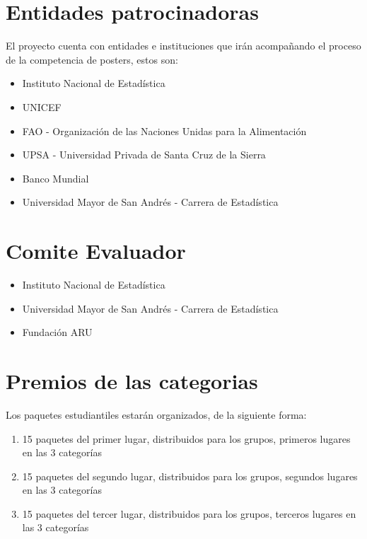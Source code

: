 \documentclass{article}
\begin{document}
\section{Entidades patrocinadoras}

El proyecto cuenta con entidades e instituciones que irán acompañando el proceso de la competencia de posters, estos son:

\begin{itemize}
\item Instituto Nacional de Estadística 
\item UNICEF
\item FAO - Organización de las Naciones Unidas para la Alimentación
\item UPSA - Universidad Privada de Santa Cruz de la Sierra
\item Banco Mundial
\item Universidad Mayor de San Andrés - Carrera de Estadística
\end{itemize}

\section{Comite Evaluador}

\begin{itemize}
\item Instituto Nacional de Estadística 
\item Universidad Mayor de San Andrés - Carrera de Estadística
\item Fundación ARU
\end{itemize}

\section{Premios de las categorias}

Los paquetes estudiantiles estarán organizados, de la siguiente forma:

\begin{enumerate}
\item 15 paquetes del primer lugar, distribuidos para los grupos, primeros lugares en las 3 categorías
\item 15 paquetes del segundo lugar, distribuidos para los grupos, segundos lugares en las 3 categorías
\item 15 paquetes del tercer lugar, distribuidos para los grupos, terceros lugares en las 3 categorías
\end{enumerate}
\end{document}
